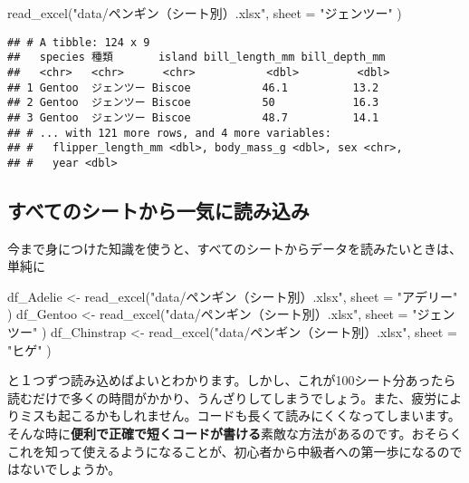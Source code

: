 \documentclass[
  xelatex,ja=standard, b5paper]{bxjsbook}
\newenvironment{Shaded}{\begin{snugshade}}{\end{snugshade}}
\newcommand{\AttributeTok}[1]{\textcolor[rgb]{0.77,0.63,0.00}{#1}}
\newcommand{\FunctionTok}[1]{\textcolor[rgb]{0.00,0.00,0.00}{#1}}
\newcommand{\NormalTok}[1]{#1}
\newcommand{\OtherTok}[1]{\textcolor[rgb]{0.56,0.35,0.01}{#1}}
\newcommand{\StringTok}[1]{\textcolor[rgb]{0.31,0.60,0.02}{#1}}
\begin{document}
\begin{Shaded}
\begin{Highlighting}[]
\FunctionTok{read\_excel}\NormalTok{(}\StringTok{"data/ペンギン（シート別）.xlsx"}\NormalTok{, }\AttributeTok{sheet =} \StringTok{"ジェンツー"}\NormalTok{ )}
\end{Highlighting}
\end{Shaded}

\begin{verbatim}
## # A tibble: 124 x 9
##   species 種類       island bill_length_mm bill_depth_mm
##   <chr>   <chr>      <chr>           <dbl>         <dbl>
## 1 Gentoo  ジェンツー Biscoe           46.1          13.2
## 2 Gentoo  ジェンツー Biscoe           50            16.3
## 3 Gentoo  ジェンツー Biscoe           48.7          14.1
## # ... with 121 more rows, and 4 more variables:
## #   flipper_length_mm <dbl>, body_mass_g <dbl>, sex <chr>,
## #   year <dbl>
\end{verbatim}

\hypertarget{dflist}{%
\subsection{すべてのシートから一気に読み込み}\label{dflist}}

今まで身につけた知識を使うと、すべてのシートからデータを読みたいときは、単純に

\begin{Shaded}
\begin{Highlighting}[]
\NormalTok{df\_Adelie }\OtherTok{\textless{}{-}} 
  \FunctionTok{read\_excel}\NormalTok{(}\StringTok{"data/ペンギン（シート別）.xlsx"}\NormalTok{, }\AttributeTok{sheet =} \StringTok{"アデリー"}\NormalTok{ )}
\NormalTok{df\_Gentoo }\OtherTok{\textless{}{-}} 
  \FunctionTok{read\_excel}\NormalTok{(}\StringTok{"data/ペンギン（シート別）.xlsx"}\NormalTok{, }\AttributeTok{sheet =} \StringTok{"ジェンツー"}\NormalTok{ )}
\NormalTok{df\_Chinstrap }\OtherTok{\textless{}{-}} 
  \FunctionTok{read\_excel}\NormalTok{(}\StringTok{"data/ペンギン（シート別）.xlsx"}\NormalTok{, }\AttributeTok{sheet =} \StringTok{"ヒゲ"}\NormalTok{ )}
\end{Highlighting}
\end{Shaded}

と１つずつ読み込めばよいとわかります。しかし、これが100シート分あったら読むだけで多くの時間がかかり、うんざりしてしまうでしょう。また、疲労によりミスも起こるかもしれません。コードも長くて読みにくくなってしまいます。そんな時に\textbf{便利で正確で短くコードが書ける}素敵な方法があるのです。おそらくこれを知って使えるようになることが、初心者から中級者への第一歩になるのではないでしょうか。
\end{document}
